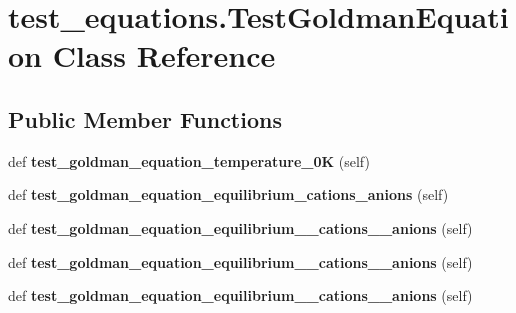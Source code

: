 \hypertarget{classtest__equations_1_1TestGoldmanEquation}{}\section{test\+\_\+equations.\+Test\+Goldman\+Equation Class Reference}
\label{classtest__equations_1_1TestGoldmanEquation}
\subsection*{Public Member Functions}
\begin{DoxyCompactItemize}
\item 
\mbox{\label{classtest__equations_1_1TestGoldmanEquation_a1b6326bd86b805e4a3d0def47679f38e}} 
def {\bfseries test\+\_\+goldman\+\_\+equation\+\_\+temperature\+\_\+0K} (self)
\item 
\mbox{\label{classtest__equations_1_1TestGoldmanEquation_ac4da6d3d6ea6a45612ab7e60e85aa9c7}} 
def {\bfseries test\+\_\+goldman\+\_\+equation\+\_\+equilibrium\+\_\+cations\+\_\+anions} (self)
\item 
\mbox{\label{classtest__equations_1_1TestGoldmanEquation_aee646871160bdc2412723e8c8817b7ed}} 
def {\bfseries test\+\_\+goldman\+\_\+equation\+\_\+equilibrium\+\_\+\_\+cations\+\_\+\_\+anions} (self)
\item 
\mbox{\label{classtest__equations_1_1TestGoldmanEquation_a017827ff2167e964167280ab03334f12}} 
def {\bfseries test\+\_\+goldman\+\_\+equation\+\_\+equilibrium\+\_\+\_\+cations\+\_\+\_\+anions} (self)
\item 
\mbox{\label{classtest__equations_1_1TestGoldmanEquation_ab5378ae321d87ef6815b41319d7d0025}} 
def {\bfseries test\+\_\+goldman\+\_\+equation\+\_\+equilibrium\+\_\+\_\+cations\+\_\+\_\+anions} (self)
\item 
\mbox{\label{classtest__equations_1_1TestGoldmanEquation_a9f06e5e269432111ae749294954afeaf}} 

\end{DoxyCompactItemize}
